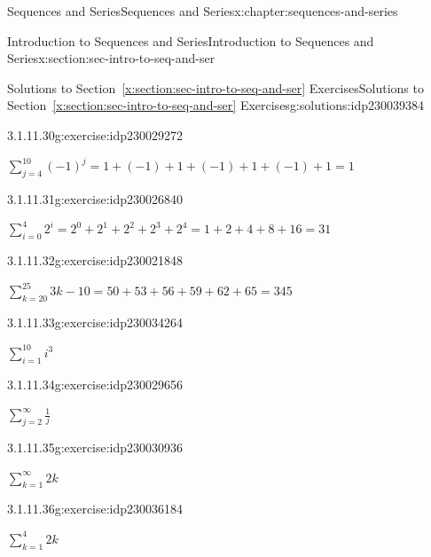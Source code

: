 \documentclass[twoside,10pt,]{book}
\newcommand{\xreffont}{\relax}
\numberwithin{equation}{section}
\begin{document}
\begin{chapterptx}{Sequences and Series}{}{Sequences and Series}{}{}{x:chapter:sequences-and-series}
\begin{sectionptx}{Introduction to Sequences and Series}{}{Introduction to Sequences and Series}{}{}{x:section:sec-intro-to-seq-and-ser}
\begin{solutions-subsection}{Solutions to Section~{\xreffont\ref*{x:section:sec-intro-to-seq-and-ser}} Exercises}{}{Solutions to Section~{\xreffont\ref*{x:section:sec-intro-to-seq-and-ser}} Exercises}{}{}{g:solutions:idp230039384}
\begin{exercisegroup}
\begin{divisionsolutioneg}{3.1.11.30}{}{g:exercise:idp230029272}%
\par\smallskip%
\noindent\hypertarget{g:solution:idp230026584-main}{}\(\sum\limits_{j = 4}^{10} {{{\left( { - 1} \right)}^j}}  = 1 + \left( { - 1} \right) + 1 + \left( { - 1} \right) + 1 + \left( { - 1} \right) + 1 = 1\)\end{divisionsolutioneg}%
\begin{divisionsolutioneg}{3.1.11.31}{}{g:exercise:idp230026840}%
\par\smallskip%
\noindent\hypertarget{g:solution:idp230023000-main}{}\(\sum\limits_{i = 0}^4 {{2^i}}  = {2^0} + {2^1} + {2^2} + {2^3} + {2^4} = 1 + 2 + 4 + 8 + 16 = 31\)\end{divisionsolutioneg}%
\begin{divisionsolutioneg}{3.1.11.32}{}{g:exercise:idp230021848}%
\par\smallskip%
\noindent\hypertarget{g:solution:idp230021976-main}{}\(\sum\limits_{k = 20}^{25} {3k - 10}  = 50 + 53 + 56 + 59 + 62 + 65 = 345\)\end{divisionsolutioneg}%
\end{exercisegroup}
\par\medskip\noindent
\begin{exercisegroup}
\begin{divisionsolutioneg}{3.1.11.33}{}{g:exercise:idp230034264}%
\par\smallskip%
\noindent\hypertarget{g:solution:idp230037592-main}{}\(\sum\limits_{i = 1}^{10} i^3 \)\end{divisionsolutioneg}%
\begin{divisionsolutioneg}{3.1.11.34}{}{g:exercise:idp230029656}%
\par\smallskip%
\noindent\hypertarget{g:solution:idp230035544-main}{}\(\sum\limits_{j = 2}^{\infty}  \frac{1}{j}\)\end{divisionsolutioneg}%
\begin{divisionsolutioneg}{3.1.11.35}{}{g:exercise:idp230030936}%
\par\smallskip%
\noindent\hypertarget{g:solution:idp230030296-main}{}\(\sum\limits_{k = 1}^{\infty} 2k\)\end{divisionsolutioneg}%
\begin{divisionsolutioneg}{3.1.11.36}{}{g:exercise:idp230036184}%
\par\smallskip%
\noindent\hypertarget{g:solution:idp230031576-main}{}\(\sum\limits_{k = 1}^4 2k\)\end{divisionsolutioneg}%

\end{exercisegroup}
\end{solutions-subsection}
\end{sectionptx}
\end{chapterptx}
\end{document}

